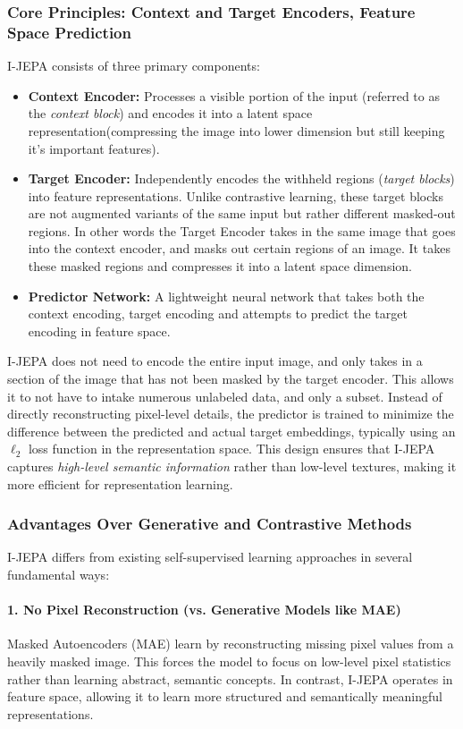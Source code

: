 \documentclass{article}
\begin{document}
\subsubsection{Core Principles: Context and Target Encoders, Feature Space Prediction}
I-JEPA consists of three primary components:
\begin{itemize}
    \item \textbf{Context Encoder:} Processes a visible portion of the input (referred to as the \textit{context block}) and encodes it into a latent space representation(compressing the image into lower dimension but still keeping it's important features).
    \item \textbf{Target Encoder:} Independently encodes the withheld regions (\textit{target blocks}) into feature representations. Unlike contrastive learning, these target blocks are not augmented variants of the same input but rather different masked-out regions. In other words the Target Encoder takes in the same image that goes into the context encoder, and masks out certain regions of an image. It takes these masked regions and compresses it into a latent space dimension. 
    \item \textbf{Predictor Network:} A lightweight neural network that takes both the context encoding, target encoding and attempts to predict the target encoding in feature space. 
\end{itemize}

I-JEPA does not need to encode the entire input image, and only takes in a section of the image that has not been masked by the target encoder. This allows it to not have to intake numerous unlabeled data, and only a subset. Instead of directly reconstructing pixel-level details, the predictor is trained to minimize the difference between the predicted and actual target embeddings, typically using an $\ell_2$ loss function in the representation space. This design ensures that I-JEPA captures \textit{high-level semantic information} rather than low-level textures, making it more efficient for representation learning.

\subsubsection{Advantages Over Generative and Contrastive Methods}
I-JEPA differs from existing self-supervised learning approaches in several fundamental ways:

\paragraph{1. No Pixel Reconstruction (vs. Generative Models like MAE)} Masked Autoencoders (MAE) \citep{he2021masked} learn by reconstructing missing pixel values from a heavily masked image. This forces the model to focus on low-level pixel statistics rather than learning abstract, semantic concepts. In contrast, I-JEPA operates in feature space, allowing it to learn more structured and semantically meaningful representations.
\end{document}
